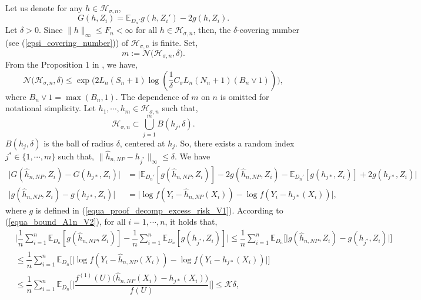 \documentclass[10pt,twoside]{article}
\numberwithin{equation}{section}
\newcommand{\E}{\ensuremath{\mathbb{E}}}
\begin{document}
\noindent
Let us denote for any $h \in \mathcal{H}_{\sigma, n}$,
%
\[G(h, Z_i) =  \E_{D_n'} g(h, Z_i') -2g(h, Z_i).
\]
%
%
 Let $ \delta >0$.  
 Since $\|h\|_\infty \leq F_n < \infty$ for all $h \in \mathcal{H}_{\sigma, n}$, then, the $\delta$-covering number (see (\ref{epsi_covering_number})) of $\mathcal{H}_{\sigma, n}$ is finite. Set,
 \begin{equation}\label{proof_def_m_n}
 m := \mathcal{N}\Big( \mathcal{H}_{\sigma, n}, \delta  \Big).
\end{equation}    
%
From the Proposition 1 in \cite{ohn2019smooth}, we have,
%
\begin{equation}\label{proof_ing_covering_num}
\mathcal{N} \Big (\mathcal{H}_{\sigma, n}, \delta \Big)  \leq  \exp \Bigg (  2 L_n (S_n + 1) \log \left(\frac{1}{\delta} C_{\sigma} L_n (N_n + 1)(B_n \lor 
 1) \right) \Bigg),
\end{equation}
%
where $B_n \lor 1 = \max(B_n, 1)$.
%
%
The dependence of $m$ on $n$ is omitted for notational simplicity.
%
Let $h_1,\cdots,h_m \in \mathcal{H}_{\sigma,n}$ such that,
%
\begin{equation}\label{proof_H_sigma_n_subset_ball}
\mathcal{H}_{\sigma,n} \subset \bigcup_{j=1}^m B(h_j, \delta).
\end{equation}
%
$B(h_j, \delta)$ is the ball of radius $\delta$, centered at $h_j$. So, there exists a random index $j^* \in \{1,\cdots, m\}$  such that, $ \|\widehat{h}_{n,NP} - h_{j^*}\|_{\infty} \leq \delta$.
%
% 
We have
%
%
\begin{align}
\label{equa_bound_A1n_V1}    \Big|G(\widehat{h}_{n,NP}, Z_i) - G(h_{j*}, Z_i) \Big| & = \Big|\E_{D_n'}[g(\widehat{h}_{n,NP}, Z_i)] - 2g(\widehat{h}_{n,NP}, Z_i) - \E_{D_n'}[g(h_{j*}, Z_i)] + 2g(h_{j*}, Z_i) \Big|
    \\
 \label{equa_bound_A1n_V2}   \Big|g(\widehat{h}_{n,NP}, Z_i) - g(h_{j*}, Z_i)\Big| & = \Big|\log f(Y_i - \widehat{h}_{n,NP}(X_i)) - \log f(Y_i - h_{j*}(X_i)) \Big|,
\end{align}
%
where $g$ is defined in (\ref{equa_proof_decomp_excess_risk_V1}).
%
According to (\ref{equa_bound_A1n_V2}), for all $i=1,\cdots,n$, it holds that,
%
\begin{align}
 \nonumber &\Big|\dfrac{1}{n}\sum_{i=1}^n \E_{D_n}[g(\widehat{h}_{n,NP}, Z_i)] - \dfrac{1}{n}\sum_{i=1}^n \E_{D_n}[g(h_{j^*}, Z_i)]\Big|  \leq \dfrac{1}{n}\sum_{i=1}^n \E_{D_n} \Big[ \Big|g(\widehat{h}_{n,NP}, Z_i) - g(h_{j^*}, Z_i) \Big|\Big] \\
 \nonumber & \leq \dfrac{1}{n}\sum_{i=1}^n \E_{D_n} \Big[ \Big|\log f(Y_i - \widehat{h}_{n,NP}(X_i)) - \log f(Y_i - h_{j*}(X_i))  \Big|\Big]  \\
 \label{equa_bound_A1n_V3} & \leq \dfrac{1}{n}\sum_{i=1}^n \E_{D_n} \Bigg[ \Bigg|\dfrac{f^{(1)}(U)\big( \widehat{h}_{n,NP}(X_i) - h_{j*}(X_i) \big)}{f(U)} \Bigg| \Bigg]  \leq \mathcal{K}  \delta,
\end{align}
\end{document}
